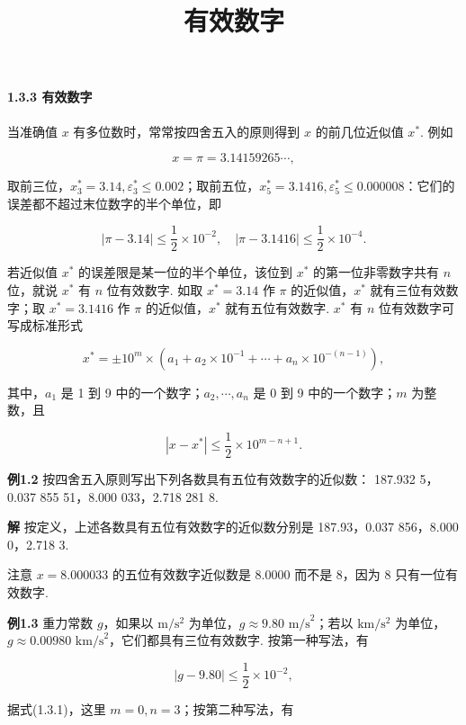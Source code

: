 \documentclass[
  10pt,
  fontset=fandol]{ctexart}
\title{有效数字}
\author{}
\date{}
\begin{document}
\maketitle

\paragraph{1.3.3 有效数字}\label{ux6709ux6548ux6570ux5b57}

当准确值 \(x\) 有多位数时，常常按四舍五入的原则得到 \(x\) 的前几位近似值 \(x^*\). 例如

\[
x = \pi = 3.14159265\cdots,
\]

取前三位，\(x_3^* = 3.14, \varepsilon_3^* \leqslant 0.002\)；取前五位，\(x_5^* = 3.1416, \varepsilon_5^* \leqslant 0.000008\)：它们的误差都不超过末位数字的半个单位，即

\[
|\pi - 3.14| \leqslant \frac{1}{2} \times 10^{-2}, \quad |\pi - 3.1416| \leqslant \frac{1}{2} \times 10^{-4}.
\]

若近似值 \(x^*\) 的误差限是某一位的半个单位，该位到 \(x^*\) 的第一位非零数字共有 \(n\) 位，就说 \(x^*\) 有 \(n\) 位有效数字. 如取 \(x^* = 3.14\) 作 \(\pi\) 的近似值，\(x^*\) 就有三位有效数字；取 \(x^* = 3.1416\) 作 \(\pi\) 的近似值，\(x^*\) 就有五位有效数字. \(x^*\) 有 \(n\) 位有效数字可写成标准形式

\[
x^* = \pm 10^m \times (a_1 + a_2 \times 10^{-1} + \cdots + a_n \times 10^{-(n-1)}), \tag{1.3.1}
\]

其中，\(a_1\) 是 1 到 9 中的一个数字；\(a_2, \cdots, a_n\) 是 0 到 9 中的一个数字；\(m\) 为整数，且

\[
|x - x^*| \leqslant \frac{1}{2} \times 10^{m-n+1}. \tag{1.3.2}
\]

\textbf{例1.2} 按四舍五入原则写出下列各数具有五位有效数字的近似数： 187.932 5，0.037 855 51，8.000 033，2.718 281 8.

\textbf{解} 按定义，上述各数具有五位有效数字的近似数分别是 187.93，0.037 856，8.000 0，2.718 3.

注意 \(x = 8.000033\) 的五位有效数字近似数是 8.0000 而不是 8，因为 8 只有一位有效数字.

\textbf{例1.3} 重力常数 \(g\)，如果以 \(\mathrm{m/s^2}\) 为单位，\(g \approx 9.80 \text{ m/s}^2\)；若以 \(\mathrm{km/s^2}\) 为单位，\(g \approx 0.00980 \text{ km/s}^2\)，它们都具有三位有效数字. 按第一种写法，有

\[
|g - 9.80| \leqslant \frac{1}{2} \times 10^{-2},
\]

据式(1.3.1)，这里 \(m=0, n=3\)；按第二种写法，有
\end{document}
